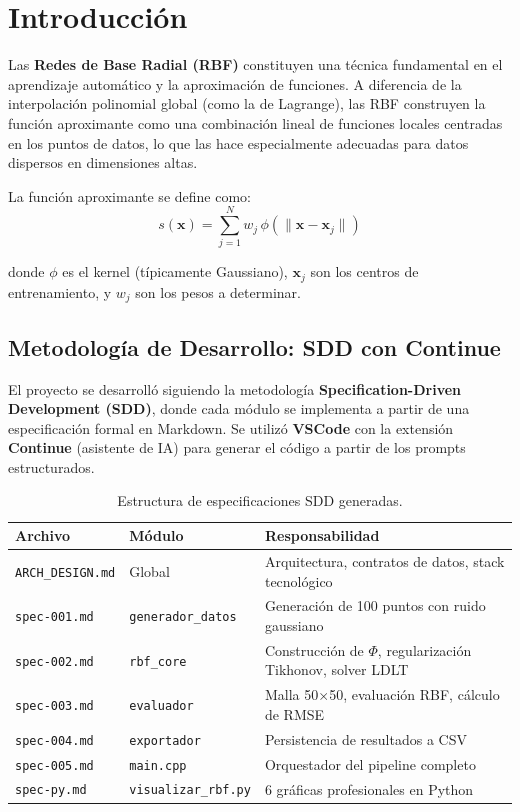 \documentclass[12pt,a4paper]{article}
\theoremstyle{definition}
\newcommand{\norm}[1]{\|#1\|}
\newcommand{\vect}[1]{\mathbf{#1}}
\begin{document}
\section{Introducci\'{o}n}\label{sec:intro}

Las \textbf{Redes de Base Radial (RBF)} constituyen una t\'{e}cnica fundamental en el aprendizaje autom\'{a}tico y la aproximaci\'{o}n de funciones. A diferencia de la interpolaci\'{o}n polinomial global (como la de Lagrange), las RBF construyen la funci\'{o}n aproximante como una combinaci\'{o}n lineal de funciones locales centradas en los puntos de datos, lo que las hace especialmente adecuadas para datos dispersos en dimensiones altas.

La funci\'{o}n aproximante se define como:
\begin{equation}\label{eq:rbf}
s(\vect{x}) = \sum_{j=1}^{N} w_j \, \phi\!\left(\norm{\vect{x} - \vect{x}_j}\right)
\end{equation}

donde $\phi$ es el kernel (t\'{i}picamente Gaussiano), $\vect{x}_j$ son los centros de entrenamiento, y $w_j$ son los pesos a determinar.

\subsection{Metodolog\'{i}a de Desarrollo: SDD con Continue}

El proyecto se desarroll\'{o} siguiendo la metodolog\'{i}a \textbf{Specification-Driven Development (SDD)}, donde cada m\'{o}dulo se implementa a partir de una especificaci\'{o}n formal en Markdown. Se utiliz\'{o} \textbf{VSCode} con la extensi\'{o}n \textbf{Continue} (asistente de IA) para generar el c\'{o}digo a partir de los prompts estructurados.

\begin{table}[H]
\centering
\caption{Estructura de especificaciones SDD generadas.}
\label{tab:specs}
\begin{tabular}{@{}llp{7cm}@{}}
\toprule
\textbf{Archivo} & \textbf{M\'{o}dulo} & \textbf{Responsabilidad} \\ \midrule
\texttt{ARCH\_DESIGN.md} & Global & Arquitectura, contratos de datos, stack tecnol\'{o}gico \\
\texttt{spec-001.md} & \texttt{generador\_datos} & Generaci\'{o}n de 100 puntos con ruido gaussiano \\
\texttt{spec-002.md} & \texttt{rbf\_core} & Construcci\'{o}n de $\Phi$, regularizaci\'{o}n Tikhonov, solver LDLT \\
\texttt{spec-003.md} & \texttt{evaluador} & Malla 50$\times$50, evaluaci\'{o}n RBF, c\'{a}lculo de RMSE \\
\texttt{spec-004.md} & \texttt{exportador} & Persistencia de resultados a CSV \\
\texttt{spec-005.md} & \texttt{main.cpp} & Orquestador del pipeline completo \\
\texttt{spec-py.md} & \texttt{visualizar\_rbf.py} & 6 gr\'{a}ficas profesionales en Python \\ \bottomrule
\end{tabular}
\end{table}
\end{document}
